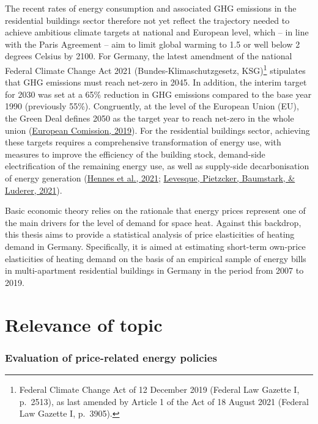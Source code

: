 \documentclass[12pt,twoside]{reedthesis}
\begin{document}
The recent rates of energy consumption and associated GHG emissions in the residential buildings sector therefore not yet reflect the trajectory needed to achieve ambitious climate targets at national and European level, which -- in line with the Paris Agreement -- aim to limit global warming to 1.5 or well below 2 degrees Celsius by 2100. For Germany, the latest amendment of the national Federal Climate Change Act 2021 (Bundes-Klimaschutzgesetz, KSG)\footnote{Federal Climate Change Act of 12 December 2019 (Federal Law Gazette I, p.~2513), as last amended by Article 1 of the Act of 18 August 2021 (Federal Law Gazette I, p.~3905).} stipulates that GHG emissions must reach net-zero in 2045. In addition, the interim target for 2030 was set at a 65\% reduction in GHG emissions compared to the base year 1990 (previously 55\%). Congruently, at the level of the European Union (EU), the Green Deal defines 2050 as the target year to reach net-zero in the whole union (\protect\hyperlink{ref-europeancomission19}{European Comission, 2019}). For the residential buildings sector, achieving these targets requires a comprehensive transformation of energy use, with measures to improve the efficiency of the building stock, demand-side electrification of the remaining energy use, as well as supply-side decarbonisation of energy generation (\protect\hyperlink{ref-hennes_etal21}{Hennes et al., 2021}; \protect\hyperlink{ref-levesque_etal21}{Levesque, Pietzcker, Baumstark, \& Luderer, 2021}).

Basic economic theory relies on the rationale that energy prices represent one of the main drivers for the level of demand for space heat. Against this backdrop, this thesis aims to provide a statistical analysis of price elasticities of heating demand in Germany. Specifically, it is aimed at estimating short-term own-price elasticities of heating demand on the basis of an empirical sample of energy bills in multi-apartment residential buildings in Germany in the period from 2007 to 2019.

\hypertarget{relevance}{%
\section{Relevance of topic}\label{relevance}}

\hypertarget{evaluation-of-price-related-energy-policies}{%
\subsubsection*{Evaluation of price-related energy policies}\label{evaluation-of-price-related-energy-policies}}
\end{document}
